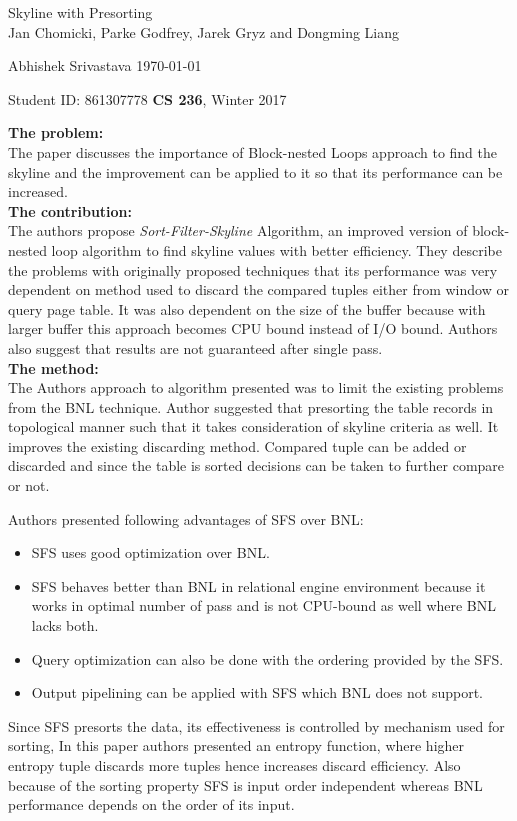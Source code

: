 \documentclass[a4paper,12pt, twoside]{article}
\renewcommand{\maketitle}{%
 	\Large
 	\begin{center}
 	Skyline with Presorting \\	
 	\normalsize Jan Chomicki, Parke Godfrey, Jarek Gryz and Dongming Liang
 	\end{center}
 
 	\Large
	Abhishek Srivastava
	\hfill
	\normalsize
	\today
 	\par
 	Student ID: 861307778
 	\hfill
 	\textbf{CS 236}, Winter 2017
 	\par 	
 	\hrulefill
 	\par
 	}
\begin{document}
\thispagestyle{empty}
	
\maketitle
\textbf{The problem:}\\
The paper discusses the importance of Block-nested Loops approach to find the skyline and the improvement can be applied to it so that its performance can be increased.\\  

\textbf{The contribution:}\\
The authors propose \emph{Sort-Filter-Skyline} Algorithm, an improved version of block-nested loop algorithm to find skyline values with better efficiency. They describe the problems with originally proposed techniques that its performance was very dependent on method used to discard the compared tuples either from window or query page table. It was also dependent on the size of the buffer because with larger buffer this approach becomes CPU bound instead of I/O bound. Authors also suggest that results are not guaranteed after single pass.\\

\textbf{The method:}\\
The Authors approach to algorithm presented was to limit the existing problems from the BNL technique. Author suggested that presorting the table records in topological manner such that it takes consideration of skyline criteria as well. It improves the existing discarding method. Compared tuple can be added or discarded and since the table is sorted decisions can be taken to further compare or not.  

Authors presented following advantages of SFS over BNL: 
\begin{itemize}
	\item SFS uses good optimization over BNL.
	\item SFS behaves better than BNL in relational engine environment because it works in optimal number of pass and is not CPU-bound as well where BNL lacks both.
	\item Query optimization can also be done with the ordering provided by the SFS.
	\item Output pipelining can be applied with SFS which BNL does not support. 
\end{itemize}
Since SFS presorts the data, its effectiveness is controlled by mechanism used for sorting, In this paper authors presented an entropy function, where higher entropy tuple discards more tuples hence increases discard efficiency. Also because of the sorting property SFS is input order independent whereas BNL performance depends on the order of its input.\\ 
\end{document}
